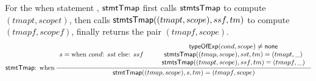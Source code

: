 %

For the when statement ,  ${\sf stmtTmap}$ %
first calls ${\sf stmtsTmap}$ %
to compute $(tmapt, scopet)$, then calls  ${\sf stmtsTmap}((tmapt, scope), ssf, tm)$ to compute $(tmapf, scopef)$, finally returns the pair $(tmapf, scope)$.
\[
		\inferii[\stmttmap: when]
{\seqq{\stmttmap((tmap, scope), s, tm) = (tmapf, scope)}}
{\seqq{s = \mbox{when } cond\mbox{: } sst \mbox{ else: } ssf }}
{
	\begin{array}{c}
		\typeofexp(cond, scope) \neq \svnone \\
		\stmtstmap((tmap, scope), sst, tm) = (tmapt, \_) \\
		\stmtstmap((tmapt, scope), ssf, tm) = (tmapf, \_)
	\end{array}
}
\]




